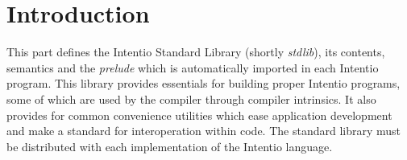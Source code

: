 \chapter{Introduction}

This part defines the Intentio Standard Library (shortly \emph{stdlib}), its contents, semantics and the \emph{prelude} which is automatically imported in each Intentio program. This library provides essentials for building proper Intentio programs, some of which are used by the compiler through compiler intrinsics. It also provides for common convenience utilities which ease application development and make a standard for interoperation within code. The standard library must be distributed with each implementation of the Intentio language.
